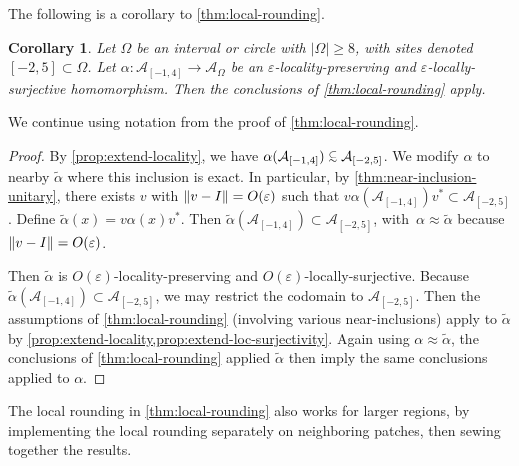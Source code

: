 \documentclass[11pt,reqno]{amsart}
\newtheorem{corollary}[theorem]{Corollary}
\theoremstyle{definition}
\theoremstyle{remark}
\numberwithin{equation}{section}
\newcommand{\eps}{\varepsilon}
\newcommand{\cA}{\mathcal A}
\DeclarePairedDelimiter\norm{\lVert}{\rVert}
\newcommand{\subsetsim}{\mathrel{\substack{\subset\\[-0.35ex]\mathclap{\sim}}}}
\begin{document}
The following is a corollary to \cref{thm:local-rounding}.
\begin{corollary} \label{cor:local-rounding}
Let $\Omega$ be an interval or circle with $|\Omega| \geq 8$, with sites denoted $[-2,5] \subset \Omega$. Let $\alpha : \cA_{[-1,4]} \to \cA_\Omega$ be an $\eps$-locality-preserving and $\eps$-locally-surjective homomorphism.  Then the conclusions of \cref{thm:local-rounding} apply.
\end{corollary}
We continue using notation from the proof of \cref{thm:local-rounding}.
\begin{proof}
    By \cref{prop:extend-locality}, we have $\alpha(\cA_{[-1,4]}) \subsetsim \cA_{[-2,5]}$.
    We modify $\alpha$ to nearby $\tilde \alpha$ where this inclusion is exact.
    In particular, by  \cref{thm:near-inclusion-unitary}, there exists $v$ with $\norm{v-I} = O(\eps)$ such that $v \alpha(\cA_{[-1,4]}) v^* \subset \cA_{[-2,5]}$.
    Define $\tilde \alpha(x) = v \alpha(x) v^*$.  Then $\tilde \alpha(\cA_{[-1,4]}) \subset \cA_{[-2,5]}$, with~$\alpha \approx \tilde \alpha$ because~$\norm{v-I}=O(\eps)$.

    Then $\tilde \alpha$ is $O(\eps)$-locality-preserving and $O(\eps)$-locally-surjective.
    Because $\tilde \alpha(\cA_{[-1,4]}) \subset \cA_{[-2,5]}$, we may restrict the codomain to $\cA_{[-2,5]}$.
    Then the assumptions of \cref{thm:local-rounding} (involving various near-inclusions) apply to $\tilde \alpha$ by \cref{prop:extend-locality,prop:extend-loc-surjectivity}.
    Again using $\alpha \approx \tilde \alpha$, the conclusions of \cref{thm:local-rounding} applied $\tilde \alpha$ then imply the same conclusions applied to $\alpha$.
\end{proof}

The local rounding in \cref{thm:local-rounding} also works for larger regions, by implementing the local rounding separately on neighboring patches, then sewing together the results.
\end{document}
